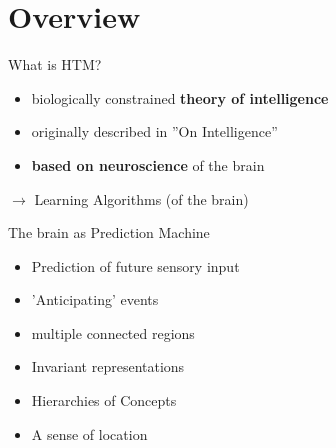\section{Overview}


\begin{frame}[c]{What is HTM?}
    \Large
    \begin{itemize}[<+(1)->]
        \item biologically constrained \textbf{theory of intelligence}
        \item originally described in ''On Intelligence''
        \item \textbf{based on neuroscience} of the brain
    \end{itemize}

    \vspace{0.5cm}

    \pause

    $\rightarrow$ Learning Algorithms \pause (of the brain)
\end{frame}



\begin{frame}[c]{The brain as Prediction Machine}
    \Large
    \begin{itemize}[<+(1)->]
        \item Prediction of future sensory input
        \item 'Anticipating' events
        \item multiple connected regions
        \item Invariant representations
        \item Hierarchies of Concepts
        \item A sense of location
    \end{itemize}
\end{frame}


